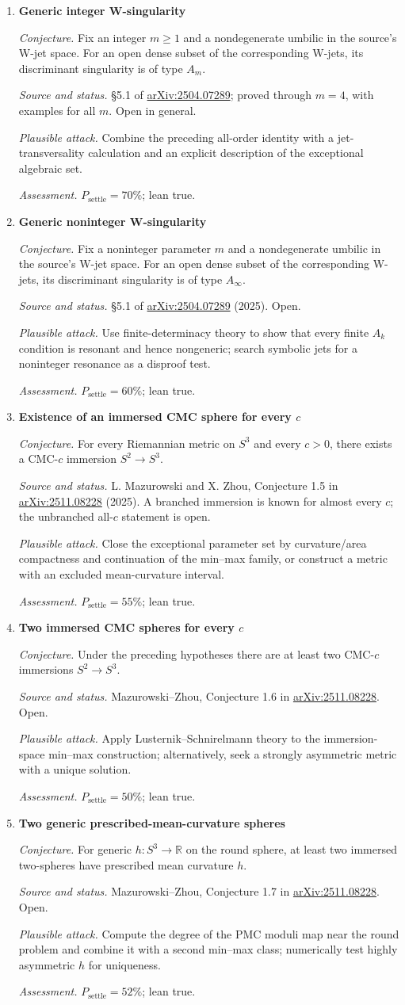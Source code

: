 \documentclass[11pt]{article}
\newcommand{\cand}[5]{%
  \item \textbf{#1}\par
  \emph{Conjecture.} #2\par
  \emph{Source and status.} #3\par
  \emph{Plausible attack.} #4\par
  \emph{Assessment.} #5
}
\newcommand{\psettle}{P_{\mathrm{settle}}}
\begin{document}
\begin{enumerate}[label=\textbf{L\arabic*.}]
\cand{Generic integer W-singularity}
{Fix an integer $m\ge1$ and a nondegenerate umbilic in the source's W-jet space.  For an open dense subset of the corresponding W-jets, its discriminant singularity is of type $A_m$.}
{\S5.1 of \href{https://arxiv.org/abs/2504.07289}{arXiv:2504.07289}; proved through $m=4$, with examples for all $m$.  Open in general.}
{Combine the preceding all-order identity with a jet-transversality calculation and an explicit description of the exceptional algebraic set.}
{$\psettle=70\%$; lean true.}

\cand{Generic noninteger W-singularity}
{Fix a noninteger parameter $m$ and a nondegenerate umbilic in the source's W-jet space.  For an open dense subset of the corresponding W-jets, its discriminant singularity is of type $A_\infty$.}
{\S5.1 of \href{https://arxiv.org/abs/2504.07289}{arXiv:2504.07289} (2025).  Open.}
{Use finite-determinacy theory to show that every finite $A_k$ condition is resonant and hence nongeneric; search symbolic jets for a noninteger resonance as a disproof test.}
{$\psettle=60\%$; lean true.}

\cand{Existence of an immersed CMC sphere for every $c$}
{For every Riemannian metric on $S^3$ and every $c>0$, there exists a CMC-$c$ immersion $S^2\to S^3$.}
{L. Mazurowski and X. Zhou, Conjecture 1.5 in \href{https://arxiv.org/abs/2511.08228}{arXiv:2511.08228} (2025).  A branched immersion is known for almost every $c$; the unbranched all-$c$ statement is open.}
{Close the exceptional parameter set by curvature/area compactness and continuation of the min--max family, or construct a metric with an excluded mean-curvature interval.}
{$\psettle=55\%$; lean true.}

\cand{Two immersed CMC spheres for every $c$}
{Under the preceding hypotheses there are at least two CMC-$c$ immersions $S^2\to S^3$.}
{Mazurowski--Zhou, Conjecture 1.6 in \href{https://arxiv.org/abs/2511.08228}{arXiv:2511.08228}.  Open.}
{Apply Lusternik--Schnirelmann theory to the immersion-space min--max construction; alternatively, seek a strongly asymmetric metric with a unique solution.}
{$\psettle=50\%$; lean true.}

\cand{Two generic prescribed-mean-curvature spheres}
{For generic $h:S^3\to\mathbb R$ on the round sphere, at least two immersed two-spheres have prescribed mean curvature $h$.}
{Mazurowski--Zhou, Conjecture 1.7 in \href{https://arxiv.org/abs/2511.08228}{arXiv:2511.08228}.  Open.}
{Compute the degree of the PMC moduli map near the round problem and combine it with a second min--max class; numerically test highly asymmetric $h$ for uniqueness.}
{$\psettle=52\%$; lean true.}


\end{enumerate}
\end{document}
